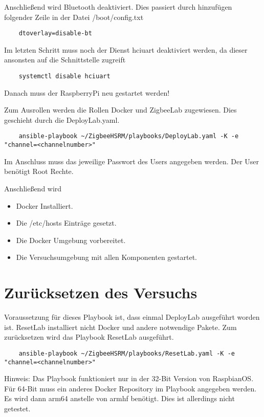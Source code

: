 Anschließend wird Bluetooth deaktiviert. Dies passiert durch hinzufügen folgender Zeile in der Datei \grqq /boot/config.txt\grqq{}
\begin{lstlisting}
    dtoverlay=disable-bt
\end{lstlisting}

Im letzten Schritt muss noch der Dienst \grqq hciuart\grqq{} deaktiviert werden, da dieser ansonsten auf die Schnittstelle zugreift
\begin{lstlisting}
    systemctl disable hciuart
\end{lstlisting}

Danach muss der RaspberryPi neu gestartet werden! 


Zum Ausrollen werden die Rollen \grqq Docker\grqq{} und \grqq ZigbeeLab\grqq{} zugewiesen. Dies geschieht durch die DeployLab.yaml.
\begin{lstlisting}
    ansible-playbook ~/ZigbeeHSRM/playbooks/DeployLab.yaml -K -e "channel=<channelnumber>"
\end{lstlisting}
Im Anschluss muss das jeweilige Passwort des Users angegeben werden. Der User benötigt Root Rechte.

Anschließend wird
\begin{itemize}
    \item Docker Installiert.
    \item Die /etc/hosts Einträge gesetzt.
    \item Die Docker Umgebung vorbereitet.
    \item Die Versuchsumgebung mit allen Komponenten gestartet.
\end{itemize}

\section{Zurücksetzen des Versuchs}

Voraussetzung für dieses Playbook ist, dass einmal DeployLab ausgeführt worden ist. ResetLab installiert nicht Docker und andere notwendige Pakete.
Zum zurücksetzen wird das Playbook \grqq ResetLab\grqq{} ausgeführt.

\begin{lstlisting}
    ansible-playbook ~/ZigbeeHSRM/playbooks/ResetLab.yaml -K -e "channel=<channelnumber>"
\end{lstlisting}
Hinweis: Das Playbook funktioniert nur in der 32-Bit Version von RaspbianOS. Für 64-Bit muss ein anderes Docker Repository im Playbook angegeben werden.
Es wird dann arm64 anstelle von armhf benötigt. Dies ist allerdings nicht getestet.

